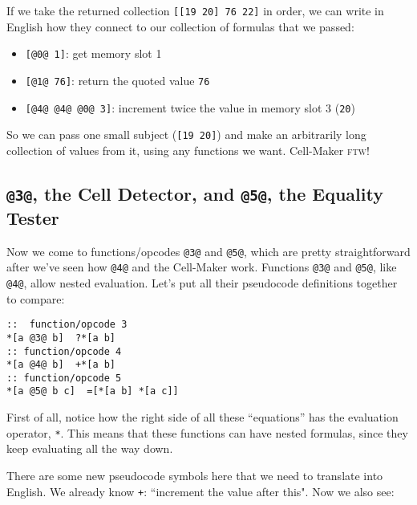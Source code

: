 \documentclass[twoside]{article}
\begin{document}
If we take the returned collection \lstinline[style=inlinecode]{[[19 20] 76 22]} in order, we can write in English how they connect to our collection of formulas that we passed:

\begin{itemize}
  \item  \lstinline[style=inlinecode]{[@0@ 1]}: get memory slot 1
  \item  \lstinline[style=inlinecode]{[@1@ 76]}: return the quoted value \lstinline[style=inlinecode]{76}
  \item  \lstinline[style=inlinecode]{[@4@ @4@ @0@ 3]}: increment twice the value in memory slot 3 (\lstinline[style=inlinecode]{20})
\end{itemize}

So we can pass one small subject (\lstinline[style=inlinecode]{[19 20]}) and make an arbitrarily long collection of values from it, using any functions we want. Cell-Maker \textsc{ftw}!

\subsection{\lstinline[style=inlinecode]{@3@}, the Cell Detector, and \lstinline[style=inlinecode]{@5@}, the Equality Tester}

Now we come to functions/opcodes \lstinline[style=inlinecode]{@3@} and \lstinline[style=inlinecode]{@5@}, which are pretty straightforward after we've seen how \lstinline[style=inlinecode]{@4@} and the Cell-Maker work. Functions \lstinline[style=inlinecode]{@3@} and \lstinline[style=inlinecode]{@5@}, like \lstinline[style=inlinecode]{@4@}, allow nested evaluation. Let's put all their pseudocode definitions together to compare:

\begin{lstlisting}[style=listingcode]
::  function/opcode 3
*[a @3@ b]  ?*[a b]
:: function/opcode 4
*[a @4@ b]  +*[a b]
:: function/opcode 5
*[a @5@ b c]  =[*[a b] *[a c]]
\end{lstlisting}

First of all, notice how the right side of all these “equations” has the evaluation operator, \lstinline[style=inlinecode]{*}. This means that these functions can have nested formulas, since they keep evaluating all the way down.

There are some new pseudocode symbols here that we need to translate into English. We already know \lstinline[style=inlinecode]{+}: ``increment the value after this". Now we also see:
\end{document}
